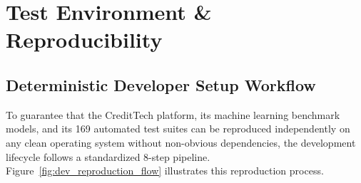 \documentclass[11pt,a4paper,oneside]{report}
\begin{document}



\chapter{Test Environment \& Reproducibility}
\label{chap:test_environment}

\section{Deterministic Developer Setup Workflow}
To guarantee that the CreditTech platform, its machine learning benchmark models, and its 169 automated test suites can be reproduced independently on any clean operating system without non-obvious dependencies, the development lifecycle follows a standardized 8-step pipeline. Figure~\ref{fig:dev_reproduction_flow} illustrates this reproduction process.
\end{document}
